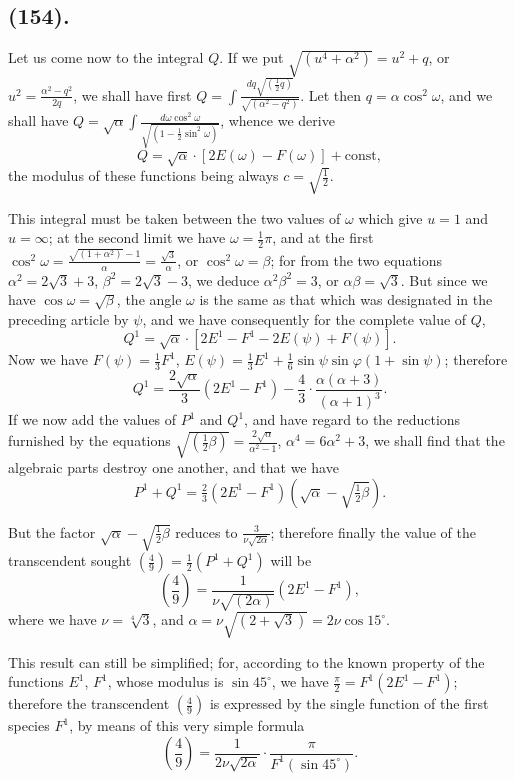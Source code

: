 \documentclass{article}
\begin{document}
\subsection*{(154).}

Let us come now to the integral $Q$. If we put $\sqrt{(u^{4}+\alpha^{2})}=u^{2}+q$, or $u^{2}=\frac{\alpha^{2}-q^{2}}{2q}$, we shall have first $Q=\displaystyle\int\frac{dq\sqrt{(\frac{1}{2}q)}}{\sqrt{(\alpha^{2}-q^{2})}}$. Let then $q=\alpha\cos^{2}\omega$, and we shall have $Q=\sqrt{\alpha}\displaystyle\int\frac{d\omega\cos^{2}\omega}{\sqrt{(1-\frac{1}{2}\sin^{2}\omega)}}$, whence we derive
\[ Q=\sqrt{\alpha}\cdot[2E(\omega)-F(\omega)]+\text{const}, \]
the modulus of these functions being always $c=\sqrt{\frac{1}{2}}$.

This integral must be taken between the two values of $\omega$ which give $u=1$ and $u=\infty$; at the second limit we have $\omega=\frac{1}{2}\pi$, and at the first $\cos^{2}\omega=\frac{\sqrt{(1+\alpha^{2})}-1}{\alpha}=\frac{\sqrt{3}}{\alpha}$, or $\cos^{2}\omega=\beta$; for from the two equations $\alpha^{2}=2\sqrt{3}+3$, $\beta^{2}=2\sqrt{3}-3$, we deduce $\alpha^{2}\beta^{2}=3$, or $\alpha\beta=\sqrt{3}$. But since we have $\cos\omega=\sqrt{\beta}$, the angle $\omega$ is the same as that which was designated in the preceding article by $\psi$, and we have consequently for the complete value of $Q$,
\[ Q^{1}=\sqrt{\alpha}\cdot[2E^{1}-F^{1}-2E(\psi)+F(\psi)]. \]
Now we have $F(\psi)=\frac{1}{3}F^{1}$, $E(\psi)=\frac{1}{3}E^{1}+\frac{1}{6}\sin\psi\sin\varphi(1+\sin\psi)$; therefore
\[ Q^{1}=\frac{2\sqrt{\alpha}}{3}(2E^{1}-F^{1})-\frac{4}{3}\cdot\frac{\alpha(\alpha+3)}{(\alpha+1)^{3}}. \]
If we now add the values of $P^{1}$ and $Q^{1}$, and have regard to the reductions furnished by the equations $\sqrt{(\frac{1}{2}\beta)}=\frac{2\sqrt{\alpha}}{\alpha^{2}-1}$, $\alpha^{4}=6\alpha^{2}+3$, we shall find that the algebraic parts destroy one another, and that we have
\[ P^{1}+Q^{1}=\tfrac{2}{3}(2E^{1}-F^{1})(\sqrt{\alpha}-\sqrt{\tfrac{1}{2}\beta}). \]

But the factor $\sqrt{\alpha}-\sqrt{\frac{1}{2}\beta}$ reduces to $\frac{3}{\nu\sqrt{2\alpha}}$; therefore finally the value of the transcendent sought $\left(\frac{4}{9}\right)=\frac{1}{2}(P^{1}+Q^{1})$ will be
\[ \left(\frac{4}{9}\right)=\frac{1}{\nu\sqrt{(2\alpha)}}(2E^{1}-F^{1}), \]
where we have $\nu=\sqrt[4]{3}$, and $\alpha=\nu\sqrt{(2+\sqrt{3})}=2\nu\cos 15^{\circ}$.

This result can still be simplified; for, according to the known property of the functions $E^{1}$, $F^{1}$, whose modulus is $\sin 45^{\circ}$, we have $\frac{\pi}{2}=F^{1}(2E^{1}-F^{1})$; therefore the transcendent $\left(\frac{4}{9}\right)$ is expressed by the single function of the first species $F^{1}$, by means of this very simple formula
\[ \left(\frac{4}{9}\right)=\frac{1}{2\nu\sqrt{2\alpha}}\cdot\frac{\pi}{F^{1}(\sin 45^{\circ})}. \]
\end{document}
